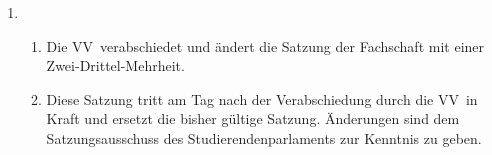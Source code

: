 \documentclass[a4paper, 12pt]{article}
\newcommand{\neu}[1]{\textcolor{OliveGreen}{#1}}
\newcommand{\vv}{VV}
\newcommand{\rates}{FSR}
\begin{document}
\begin{enumerate}[leftmargin=0cm]
	\item {}
	\begin{enumerate}[leftmargin=0cm]
		\item Die \vv~verabschiedet und ändert die Satzung der Fachschaft mit einer Zwei-Drittel-Mehrheit.
		\item Diese Satzung tritt am Tag nach der Verabschiedung durch die \vv~in
		Kraft und ersetzt die bisher gültige Satzung. Änderungen sind dem Satzungsausschuss des Studierendenparlaments zur Kenntnis zu geben.
	\end{enumerate}
	
	\end{enumerate}

\end{document}
